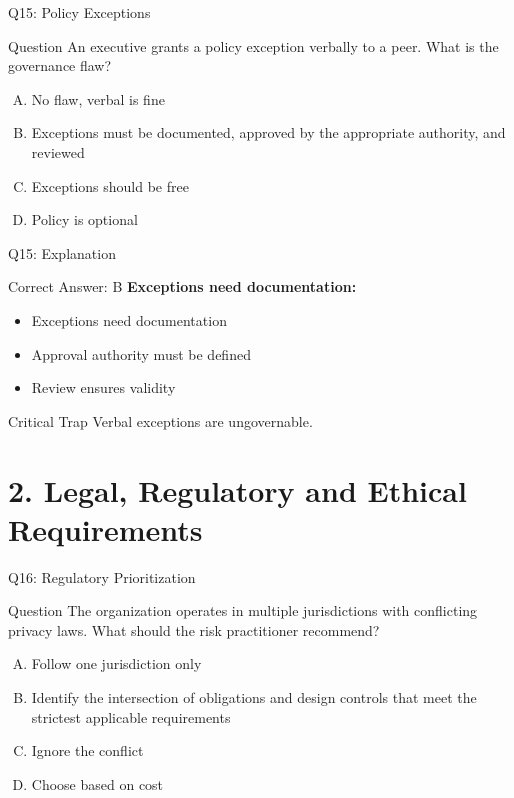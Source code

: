 \documentclass{beamer}
\begin{document}
	\begin{frame}{Q15: Policy Exceptions}
		\begin{block}{Question}
			An executive grants a policy exception verbally to a peer. What is the governance flaw?
		\end{block}
		\begin{enumerate}[(A)]
			\item No flaw, verbal is fine
			\item Exceptions must be documented, approved by the appropriate authority, and reviewed
			\item Exceptions should be free
			\item Policy is optional
		\end{enumerate}
	\end{frame}
	
	\begin{frame}{Q15: Explanation}
		\begin{block}{Correct Answer: B}
			\textbf{Exceptions need documentation:}
			\begin{itemize}
				\item Exceptions need documentation
				\item Approval authority must be defined
				\item Review ensures validity
			\end{itemize}
		\end{block}
		\begin{alertblock}{Critical Trap}
			Verbal exceptions are ungovernable.
		\end{alertblock}
	\end{frame}
	
	\section{2. Legal, Regulatory and Ethical Requirements}
	
	\begin{frame}{Q16: Regulatory Prioritization}
		\begin{block}{Question}
			The organization operates in multiple jurisdictions with conflicting privacy laws. What should the risk practitioner recommend?
		\end{block}
		\begin{enumerate}[(A)]
			\item Follow one jurisdiction only
			\item Identify the intersection of obligations and design controls that meet the strictest applicable requirements
			\item Ignore the conflict
			\item Choose based on cost
		\end{enumerate}
	\end{frame}
	
\end{document}
